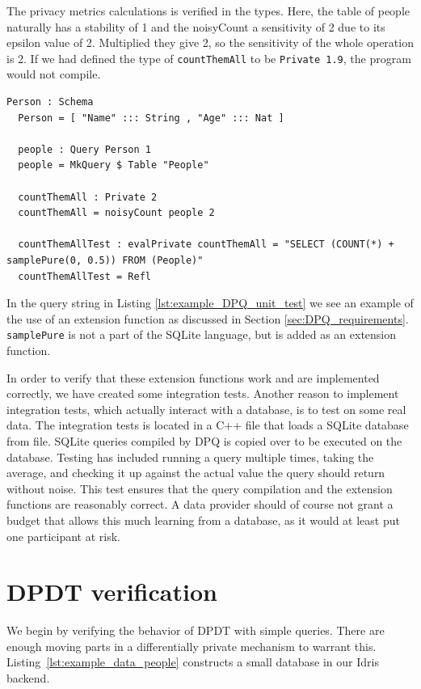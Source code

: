 \documentclass[12pt]{report}
\begin{document}
The privacy metrics calculations is verified in the types.
Here, the table of people naturally has a stability of 1 and the noisyCount a sensitivity of 2 due to its epsilon value of 2.
Multiplied they give 2, so the sensitivity of the whole operation is 2.
If we had defined the type of \texttt{countThemAll} to be \texttt{Private 1.9}, the program would not compile.

\begin{lstlisting}[caption={Unit test for noisyCount},label={lst:example_DPQ_unit_test}]
  Person : Schema
  Person = [ "Name" ::: String , "Age" ::: Nat ]

  people : Query Person 1
  people = MkQuery $ Table "People"

  countThemAll : Private 2
  countThemAll = noisyCount people 2

  countThemAllTest : evalPrivate countThemAll = "SELECT (COUNT(*) + samplePure(0, 0.5)) FROM (People)"
  countThemAllTest = Refl

\end{lstlisting}

In the query string in Listing \ref{lst:example_DPQ_unit_test} we see an example of the use of an extension function as discussed in Section \ref{sec:DPQ_requirements}.
\texttt{samplePure} is not a part of the SQLite language, but is added as an extension function.

In order to verify that these extension functions work and are implemented correctly, we have created some integration tests.
Another reason to implement integration tests, which actually interact with a database, is to test on some real data.
The integration tests is located in a C++ file that loads a SQLite database from file.
SQLite queries compiled by DPQ is copied over to be executed on the database.
Testing has included running a query multiple times, taking the average, and checking it up against the actual value the query should return without noise.
This test ensures that the query compilation and the extension functions are reasonably correct.
A data provider should of course not grant a budget that allows this much learning from a database, as it would at least put one participant at risk.

\section{DPDT verification}

We begin by verifying the behavior of DPDT with simple queries.
There are enough moving parts in a differentially private mechanism to warrant this.
Listing~\ref{lst:example_data_people} constructs a small database in our Idris backend.
\end{document}
